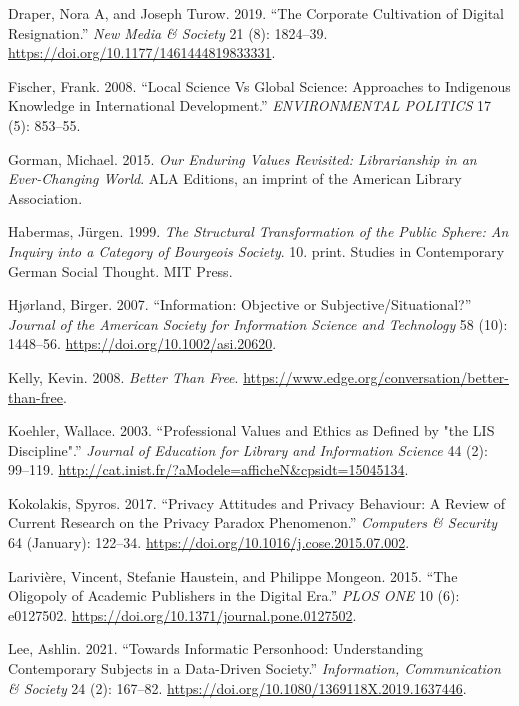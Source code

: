 \documentclass[
  letterpaper,
  DIV=11,
  numbers=noendperiod]{scrreprt}
\newlength{\cslhangindent}
\newenvironment{CSLReferences}[2] %
 {\begin{list}{}{%
  \setlength{\itemindent}{0pt}
  \setlength{\leftmargin}{0pt}
  \setlength{\parsep}{0pt}
  \ifodd #1
   \setlength{\leftmargin}{\cslhangindent}
   \setlength{\itemindent}{-1\cslhangindent}
  \fi
  \setlength{\itemsep}{#2\baselineskip}}}
 {\end{list}}
\begin{document}
\begin{CSLReferences}{1}{1}
Draper, Nora A, and Joseph Turow. 2019. {``The Corporate Cultivation of
Digital Resignation.''} \emph{New Media \& Society} 21 (8): 1824--39.
\url{https://doi.org/10.1177/1461444819833331}.

Fischer, Frank. 2008. {``Local Science Vs Global Science: Approaches to
Indigenous Knowledge in International Development.''}
\emph{ENVIRONMENTAL POLITICS} 17 (5): 853--55.

Gorman, Michael. 2015. \emph{Our Enduring Values Revisited:
Librarianship in an Ever-Changing World}. ALA Editions, an imprint of
the American Library Association.

Habermas, Jürgen. 1999. \emph{The Structural Transformation of the
Public Sphere: An Inquiry into a Category of Bourgeois Society}. 10.
print. Studies in Contemporary German Social Thought. MIT Press.

Hjørland, Birger. 2007. {``Information: {Objective} or
Subjective/Situational?''} \emph{Journal of the American Society for
Information Science and Technology} 58 (10): 1448--56.
\url{https://doi.org/10.1002/asi.20620}.

Kelly, Kevin. 2008. \emph{Better Than Free}.
\url{https://www.edge.org/conversation/better-than-free}.

Koehler, Wallace. 2003. {``Professional Values and Ethics as Defined by
{"}the LIS Discipline{"}.''} \emph{Journal of Education for Library and
Information Science} 44 (2): 99--119.
\url{http://cat.inist.fr/?aModele=afficheN&cpsidt=15045134}.

Kokolakis, Spyros. 2017. {``Privacy Attitudes and Privacy Behaviour: A
Review of Current Research on the Privacy Paradox Phenomenon.''}
\emph{Computers \& Security} 64 (January): 122--34.
\url{https://doi.org/10.1016/j.cose.2015.07.002}.

Larivière, Vincent, Stefanie Haustein, and Philippe Mongeon. 2015.
{``The Oligopoly of Academic Publishers in the Digital Era.''}
\emph{PLOS ONE} 10 (6): e0127502.
\url{https://doi.org/10.1371/journal.pone.0127502}.

Lee, Ashlin. 2021. {``Towards {Informatic} {Personhood}: Understanding
Contemporary Subjects in a Data-Driven Society.''} \emph{Information,
Communication \& Society} 24 (2): 167--82.
\url{https://doi.org/10.1080/1369118X.2019.1637446}.


\end{CSLReferences}
\end{document}
